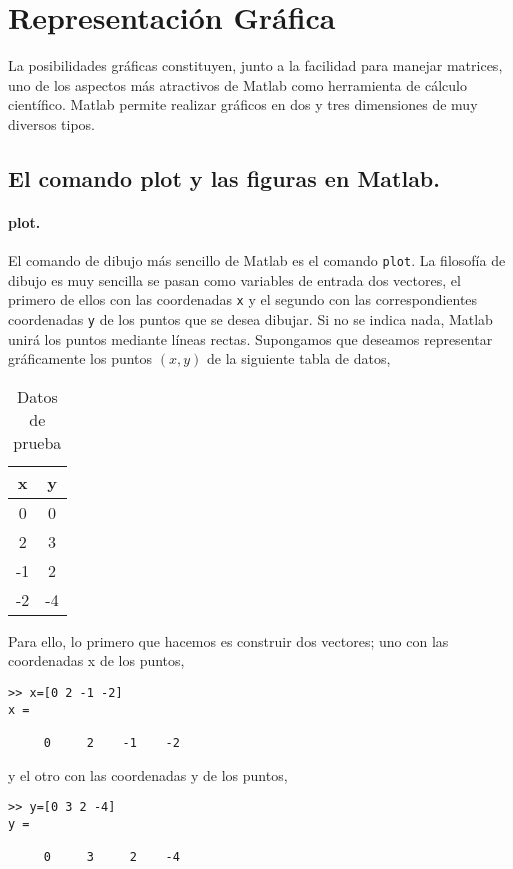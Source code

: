 \section{Representación Gráfica}
La posibilidades gráficas constituyen, junto a la facilidad para manejar matrices, uno de los aspectos más atractivos de Matlab como herramienta de cálculo científico. Matlab permite realizar gráficos en dos y tres dimensiones de muy diversos tipos. 

\subsection{El comando plot y las figuras en Matlab.}
\paragraph{plot.} El comando de dibujo más sencillo de Matlab es el comando \texttt{plot}. La filosofía de dibujo es muy sencilla se pasan como variables de entrada dos vectores, el primero de ellos con las coordenadas \texttt{x} y el segundo con las correspondientes coordenadas \texttt{y} de los puntos que se desea dibujar. Si no se indica nada, Matlab unirá los puntos mediante líneas rectas. Supongamos que deseamos representar gráficamente los puntos $(x,y)$ de la siguiente tabla de datos,

\begin{table}[h]
\caption{Datos de prueba}
\centering
\begin{tabular}{|c|c|}
x&y\\ 
\hline
0&0\\
2&3\\
-1&2\\
-2&-4\\ 
\end{tabular}
\label{tpuntos}
\end{table} 

Para ello, lo primero que hacemos es construir dos vectores; uno con las coordenadas x de los puntos,
\begin{verbatim}
>> x=[0 2 -1 -2]
x =

     0     2    -1    -2

\end{verbatim}
y el otro con las coordenadas y de los puntos,
\begin{verbatim}
>> y=[0 3 2 -4]
y =

     0     3     2    -4
\end{verbatim}
 
